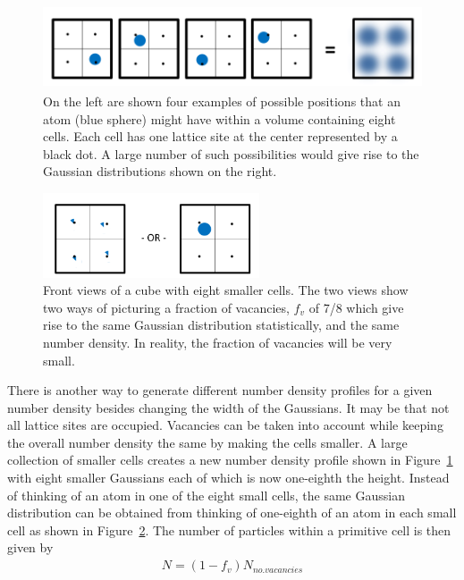 \documentclass[double,12pt]{beavtex}
\begin{document}
\begin{figure}
   \centering
   \includegraphics[height=2.5cm]{Ensemble_Smallcells.png}
   \caption{On the left are shown four examples of possible positions 
   that an atom (blue sphere) might have within a volume 
   containing eight cells. Each cell has one lattice site at the center 
   represented by a black dot. A large number of such possibilities 
   would give rise to the Gaussian distributions shown on the right.}
   \label{fig:Ensemble_Smallcells}
\end{figure} 

\begin{figure}
   \centering
   \includegraphics[height=2.5cm]{SameStatPic.png}
   \caption{Front views of a cube with eight smaller cells. The two views 
   show two ways of picturing a fraction of vacancies, $f_v$ of 7/8 which 
   give rise to the same Gaussian distribution statistically, 
   and the same number density. In reality, the fraction of vacancies will
   be very small.}
   \label{fig:SameStatPic}
\end{figure} 

There is another way to generate different number density profiles for 
a given number density besides changing the width of the Gaussians. 
It may be that not all lattice sites are occupied. Vacancies can be taken 
into account while keeping the overall number density the same by 
making the cells smaller. A large collection of smaller cells creates a 
new number density profile shown in Figure~\ref{fig:Ensemble_Smallcells} 
with eight smaller Gaussians each of which is now one-eighth the height. 
Instead of thinking of an atom in one of the eight small cells, the same 
Gaussian distribution can be obtained from thinking of one-eighth of an 
atom in each small cell as shown in Figure~\ref{fig:SameStatPic}.  
The number of particles within a primitive cell is then given by  
\begin{align}
    N= (1-f_v){N_{no.vacancies}}
\end{align} 
\end{document}
